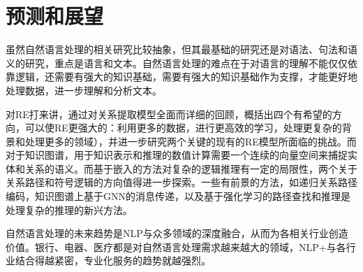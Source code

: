 \documentclass[UTF8,a4paper]{ctexart}
\begin{document}
\section{预测和展望}
虽然自然语言处理的相关研究比较抽象，但其最基础的研究还是对语法、句法和语义的研究，重点是语言和文本。自然语言处理的难点在于对语言的理解不能仅仅依靠逻辑，还需要有强大的知识基础，需要有强大的知识基础作为支撑，才能更好地处理数据，进一步理解和分析文本。
\par 
对RE打来讲，通过对关系提取模型全面而详细的回顾，概括出四个有希望的方向，可以使RE更强大的：利用更多的数据，进行更高效的学习，处理更复杂的背景和处理更多的领域），并进一步研究两个关键的现有的RE模型所面临的挑战。而对于知识图谱，用于知识表示和推理的数值计算需要一个连续的向量空间来捕捉实体和关系的语义。而基于嵌入的方法对复杂的逻辑推理有一定的局限性，两个关于关系路径和符号逻辑的方向值得进一步探索。一些有前景的方法，如递归关系路径编码，知识图谱上基于GNN的消息传递，以及基于强化学习的路径查找和推理是处理复杂的推理的新兴方法。
\par 
自然语言处理的未来趋势是NLP与众多领域的深度融合，从而为各相关行业创造价值。银行、电器、医疗都是对自然语言处理需求越来越大的领域，NLP+与各行业结合得越紧密，专业化服务的趋势就越强烈。

\renewcommand{\refname}{参考文献}


\clearpage
\end{document}
